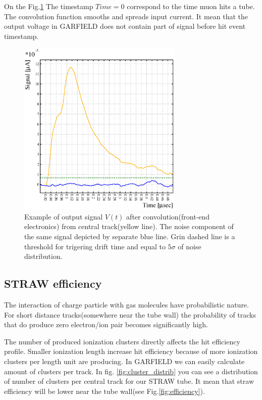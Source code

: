 \documentclass[12pt,a4paper]{article}
\begin{document}
	On the Fig.\ref{fig:signal_example} The timestamp $Time=0$ correspond to the time muon hits a tube. The convolution function smooths and spreads input current. It mean that the output voltage in GARFIELD does not contain part of signal before hit event timestamp.

	\begin{figure}[h!]
	\centering
	\includegraphics[width=0.7\textwidth]{signal_noise_threshold.eps}
	\caption{ Example of output signal $V(t)$ after convolution(front-end electronics) from central track(yellow line). The noise component of the same signal depicted by separate blue line. Grin dashed line is a threshold for trigering drift time and equal to $5\sigma$ of noise distribution.}
	\label{fig:signal_example}
	\end{figure}
	
	\subsection{ STRAW efficiency}
	
	The interaction of charge particle with gas molecules have probabilistic nature. For short distance tracks(somewhere near the tube wall) the probability of tracks that do produce zero electron/ion pair becomes significantly high.
		
	The number of produced ionization clusters directly affects the hit efficiency profile. \cite{kozlinskiy} Smaller ionization length increase hit efficiency because of more ionization clusters per length unit are producing. In GARFIELD we can easily calculate amount of clusters per track. In fig. \ref{fig:cluster_distrib} you can see a distribution of number of clusters per central track for our STRAW tube. It mean that straw efficiency will be lower near the tube wall(see Fig.\ref{fig:efficiency}).
		
\end{document}
